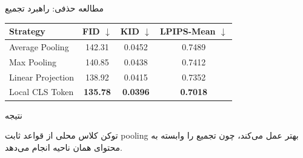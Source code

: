 \documentclass[aspectratio=169, 10pt]{beamer}
\newenvironment{duobox}[1]{%
    \begin{block}{#1}\setlength{\parskip}{0.2em}\small
}{%
    \end{block}
}
\begin{document}
\begin{frame}{مطالعه حذفی: راهبرد تجمیع}
    \centering
    \begin{latin}
    \begin{tabular}{lccc}
        \toprule
        Strategy & FID \(\downarrow\) & KID \(\downarrow\) & LPIPS-Mean \(\downarrow\)\\
        \midrule
        Average Pooling & 142.31 & 0.0452 & 0.7489\\
        Max Pooling & 140.85 & 0.0438 & 0.7412\\
        Linear Projection & 138.92 & 0.0415 & 0.7352\\
        Local CLS Token & \textbf{135.78} & \textbf{0.0396} & \textbf{0.7018}\\
        \bottomrule
    \end{tabular}
    \end{latin}
    \vspace{0.8em}
    \begin{duobox}{نتیجه}
        توکن کلاس محلی از قواعد ثابت pooling بهتر عمل می‌کند، چون تجمیع را وابسته به محتوای همان ناحیه انجام می‌دهد.
    \end{duobox}
\end{frame}
\end{document}
